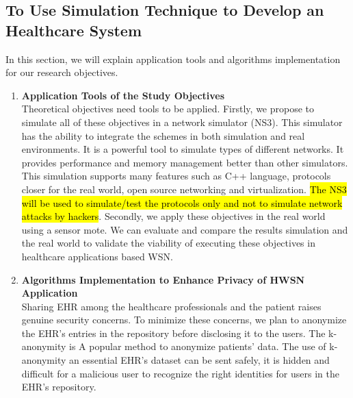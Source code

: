 \documentclass[a4paper,11pt]{article}
\DeclareRobustCommand{\hlyellow}[1]{{\sethlcolor{white}\hl{#1}}}
\begin{document}
\subsection{To Use Simulation Technique to Develop an Healthcare System}
In this section, we will explain application tools and algorithms implementation for our research objectives.
\begin{enumerate}

\item \textbf{Application Tools of the Study Objectives}\\
Theoretical objectives need tools to be applied. Firstly, we propose to simulate all of these objectives in a network simulator (NS3). This simulator has the ability to integrate the schemes in both simulation and real environments. It is a powerful tool to simulate types of different networks. It provides performance and memory management better than other simulators. This simulation supports many features such as C++ language, protocols closer for the real world, open source networking and virtualization. \hlyellow{The NS3 will be used to simulate/test the protocols only and not to simulate network attacks by hackers}. Secondly, we apply these objectives in the real world using a sensor mote. We can evaluate and compare the results simulation and the real world to validate the viability of executing these objectives in healthcare applications based WSN.

\item \textbf{Algorithms Implementation to Enhance Privacy of HWSN Application}\\
Sharing EHR among the healthcare professionals and the patient raises genuine security concerns. To minimize these concerns, we plan to anonymize the EHR's entries in the repository before disclosing it to the users. The k-anonymity is A popular method to anonymize patients' data. The use of k-anonymity \cite{pr22} an essential EHR's dataset can be sent safely, it is hidden and difficult for a malicious user to recognize the right identities for users in the EHR's repository. 
\end{enumerate}
\end{document}
